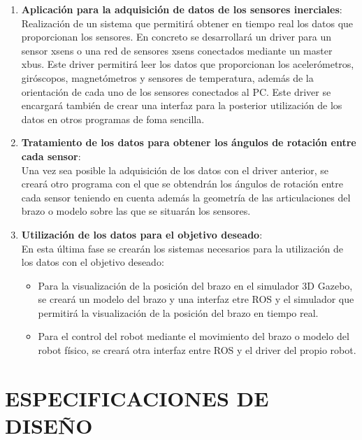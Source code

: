 \documentclass[10pt,a4paper]{report}
\begin{document}
\begin{enumerate}
\item \textbf{Aplicación para la adquisición de datos de los sensores inerciales}: \\
Realización de un sistema que permitirá obtener en tiempo real los datos que proporcionan los sensores. En concreto se desarrollará un driver para un sensor xsens o una red de sensores xsens conectados mediante un master xbus. Este driver permitirá leer los datos que proporcionan los acelerómetros, giróscopos, magnetómetros y sensores de temperatura, además de la orientación de cada uno de los sensores conectados al PC. Este driver se encargará también de crear una interfaz para la posterior utilización de los datos en otros programas de foma sencilla. \\

\item \textbf{Tratamiento de los datos para obtener los ángulos de rotación entre cada sensor}:\\
Una vez sea posible la adquisición de los datos con el driver anterior, se creará otro programa con el que se obtendrán los ángulos de rotación entre cada sensor teniendo en cuenta además la geometría de las articulaciones del brazo o modelo sobre las que se situarán los sensores.\\

\item \textbf{Utilización de los datos para el objetivo deseado}: \\
En esta última fase se crearán los sistemas necesarios para la utilización de los datos con el objetivo deseado:

\begin{itemize}

\item Para la visualización de la posición del brazo en el simulador 3D Gazebo, se creará un modelo del brazo y una interfaz etre ROS y el simulador que permitirá la visualización de la posición del brazo en tiempo real.  

\item Para el control del robot mediante el movimiento del brazo o modelo del robot físico, se creará otra interfaz entre ROS y el driver del propio robot. 

\end{itemize}

\end{enumerate}


\chapter{ESPECIFICACIONES DE DISEÑO}
\end{document}
